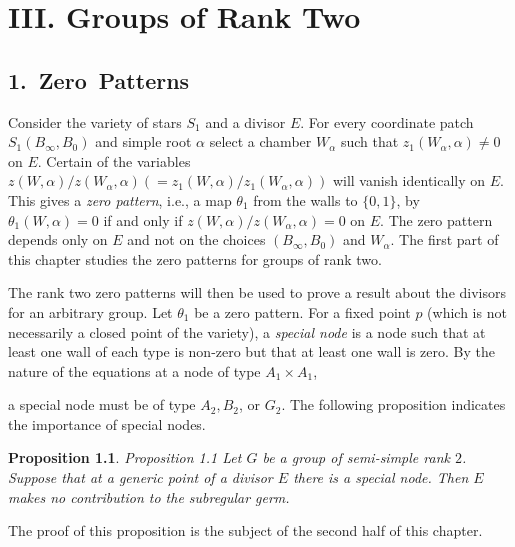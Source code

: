 \documentclass{memo-l}
\newtheorem{proposition}[theorem]{Proposition}
\theoremstyle{definition}
\theoremstyle{remark}
\numberwithin{section}{chapter}
\numberwithin{equation}{chapter}
\begin{document}


%
\chapter{III. Groups of Rank Two} 
%


\section{1.\  Zero\ Patterns}



  Consider the variety of stars $S_{1}$ and a divisor $E$. 
 For every coordinate patch $S_{1}(B_{{\infty}},B_{0})$ and simple root 
${\alpha}$ select a chamber $W_{\alpha}$ such that 
$z_{1}(W_{\alpha},{\alpha})\ne 0$ on $E$. 
 Certain of the variables $z(W,{\alpha})/z(W_{\alpha},{\alpha}) 
(= z_{1}(W,{\alpha})/z_{1}(W_{\alpha},{\alpha}))$ will vanish identically 
on $E$. 
  This gives a {\it zero pattern}, i.e., 
a map ${\theta}_{1}$ from the walls to $\{0,1\}$, by 
${\theta}_{1}(W,{\alpha}) = 0$ if and only if $z(W,{\alpha})/z(W_{\alpha},
{\alpha}) = 0$ on $E$. 
 The zero pattern depends only on $E$ and not on the choices 
$(B_{{\infty}},B_{0})$ and $W_{\alpha}$. 
 The first part of this chapter studies the zero patterns for groups of 
rank two. 

   The rank two zero patterns will then be used to prove a result about 
the divisors for an arbitrary group. 
 Let ${\theta}_{1}$ be a zero pattern. 
 For a fixed point $p$ (which is not necessarily a closed point of the 
variety), a {\it special node}  is a node such that at least one wall of 
each type is non-zero but that at least one wall is zero. 
 By the nature of the equations at a node of type $A_{1} \times A_{1}$,

\medskip

\medskip
\noindent
a special node must be of type $A_{2}, B_{2}$, or $G_{2}$. 
  The following proposition indicates the importance of special nodes.

\begin{proposition}{Proposition 1.1}   Let $G$ be a group of semi-simple rank $2$. 
 Suppose that at a generic point of a divisor $E$ there is a special node. 
 Then $E$ makes no contribution to the subregular germ. 
 \end{proposition}

   The proof of this proposition is the subject of the second half of 
this chapter.
\end{document}
